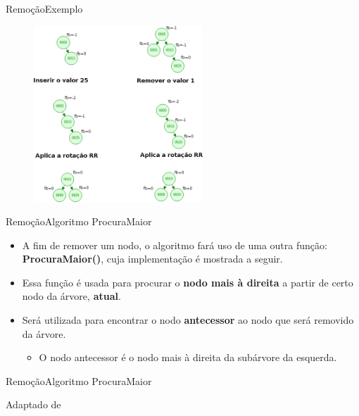 \documentclass[aspectratio=169]{beamer}
\begin{document}
\begin{frame}{Remoção}{Exemplo}

\begin{figure}[!h]
  \centering
  \includegraphics[width=180pt]{imagens/exemplo_remocao.png}
  \label{fig_exemplo_remocao}
\end{figure}
\end{frame}


\begin{frame}{Remoção}{Algoritmo ProcuraMaior}
\begin{itemize}
 \item A fim de remover um nodo, o algoritmo fará uso de uma outra função: {\bf ProcuraMaior()}, cuja implementação é mostrada a seguir. 
 \item Essa função é usada para procurar o {\bf nodo mais à direita} a partir de certo nodo da árvore, {\bf atual}.
 \item Será utilizada para encontrar o nodo {\bf antecessor} ao nodo que será removido da árvore.
 \begin{itemize}
 \item O nodo antecessor é o nodo mais à direita da subárvore da esquerda.
 \end{itemize} 
\end{itemize}
\end{frame}


\begin{frame}{Remoção}{Algoritmo ProcuraMaior}
\begin{algorithm}[H]
\caption{ProcuraMaior} 
\label{ProcuraMaior}
\end{algorithm}
\tiny{Adaptado de \cite{Backes2016}}  
\end{frame}
\end{document}
